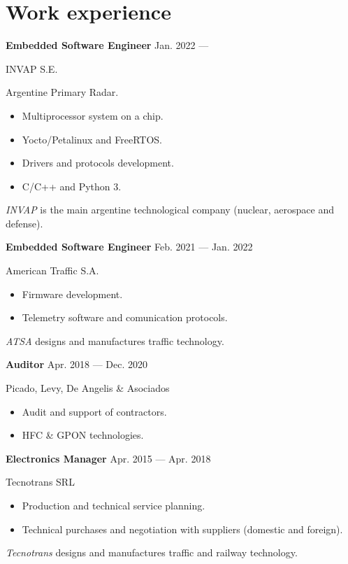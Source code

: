 \section{Work experience}


\parbox[t][][t]{\linewidth}{
	\parbox{\linewidth}{
		\textbf{Embedded Software Engineer}
			\hfill
			{Jan. 2022 --- \phantom{Dec. 2099}}
		}
	\smallbreak
	\parbox{\linewidth}{INVAP S.E.}
	\smallbreak
	Argentine Primary Radar.
	\begin{itemize}
	    \item{Multiprocessor system on a chip.}
		\item{Yocto/Petalinux and FreeRTOS.}
		\item{Drivers and protocols development.}
		\item{C/C++ and Python 3.}
	\end{itemize}
	\smallbreak
    \emph{INVAP} is the main argentine technological company (nuclear, aerospace and defense).
}

\bigskip
\parbox[t][][t]{\linewidth}{
	\parbox{\linewidth}{
		\textbf{Embedded Software Engineer}
			\hfill
			{Feb. 2021 --- Jan. 2022}
		}
	\smallbreak
	\parbox{\linewidth}{American Traffic S.A.}
	\smallbreak
	\begin{itemize}
	    \item{Firmware development.}
	    \item{Telemetry software and comunication protocols.}
	\end{itemize}
	\smallbreak
    \emph{ATSA} designs and manufactures traffic technology.
}

\bigskip
\parbox[t][][t]{\linewidth}{
	\parbox{\linewidth}{
		\textbf{Auditor}
			\hfill
			{Apr. 2018 --- Dec. 2020}
		}
	\smallbreak
	\parbox{\linewidth}{Picado, Levy, De Angelis \& Asociados}
	\smallbreak
	\begin{itemize}
	    \item{Audit and support of contractors.}
	    \item{HFC \& GPON technologies.}
	\end{itemize}
	\smallbreak
}

\bigskip
\parbox[t][][t]{\linewidth}{
	{\parbox{\linewidth}{
		\parbox{\linewidth}{
			\textbf{Electronics Manager}
			\hfill
			{Apr. 2015 --- Apr. 2018}
		}
	}}
	\smallbreak
	\parbox{\linewidth}{Tecnotrans SRL}
	\smallbreak
	\begin{itemize}
	    \item{Production and technical service planning.}
	    \item{Technical purchases and negotiation with suppliers (domestic and foreign).}
	\end{itemize}
	\smallbreak
	\emph{Tecnotrans} designs and manufactures traffic and railway technology.
}

